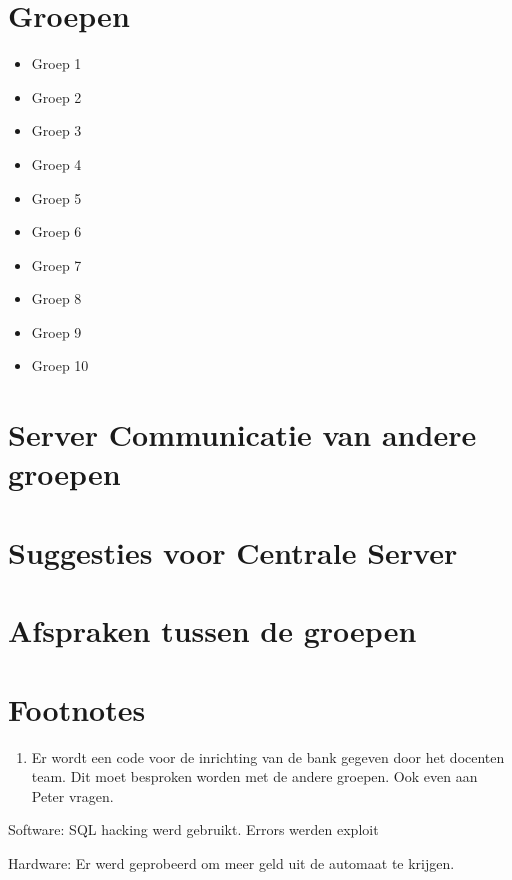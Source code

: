 \documentclass{article}
\begin{document}
\section{Groepen}
\begin{itemize}
	\item Groep 1
	\item Groep 2
	\item Groep 3
	\item Groep 4
	\item Groep 5
	\item Groep 6
	\item Groep 7
	\item Groep 8
	\item Groep 9
	\item Groep 10
\end{itemize}

\section{Server Communicatie van andere groepen}

\section{Suggesties voor Centrale Server}

\section{Afspraken tussen de groepen}

\section{Footnotes}
\begin{enumerate}
	\item Er wordt een code voor de inrichting van de bank gegeven door het docenten team.
	Dit moet besproken worden met de andere groepen. Ook even aan Peter vragen.
\end{enumerate}

Software:
SQL hacking werd gebruikt.
Errors werden exploit

Hardware:
Er werd geprobeerd om meer geld uit de automaat te krijgen.
\end{document}
